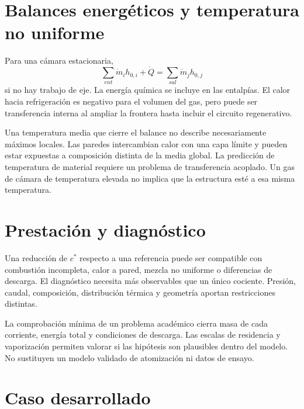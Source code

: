 \section{Balances energéticos y temperatura no uniforme}
Para una cámara estacionaria,
\[
 \sum_{ent}\dot m_i h_{0,i}+\dot Q
 =\sum_{sal}\dot m_j h_{0,j}
\]
si no hay trabajo de eje. La energía química se incluye en las entalpías. El calor hacia refrigeración es negativo para el volumen del gas, pero puede ser transferencia interna al ampliar la frontera hasta incluir el circuito regenerativo.

Una temperatura media que cierre el balance no describe necesariamente máximos locales. Las paredes intercambian calor con una capa límite y pueden estar expuestas a composición distinta de la media global. La predicción de temperatura de material requiere un problema de transferencia acoplado. Un gas de cámara de temperatura elevada no implica que la estructura esté a esa misma temperatura.
\section{Prestación y diagnóstico}
Una reducción de $c^*$ respecto a una referencia puede ser compatible con combustión incompleta, calor a pared, mezcla no uniforme o diferencias de descarga. El diagnóstico necesita más observables que un único cociente. Presión, caudal, composición, distribución térmica y geometría aportan restricciones distintas.

La comprobación mínima de un problema académico cierra masa de cada corriente, energía total y condiciones de descarga. Las escalas de residencia y vaporización permiten valorar si las hipótesis son plausibles dentro del modelo. No sustituyen un modelo validado de atomización ni datos de ensayo.
\section{Caso desarrollado}

